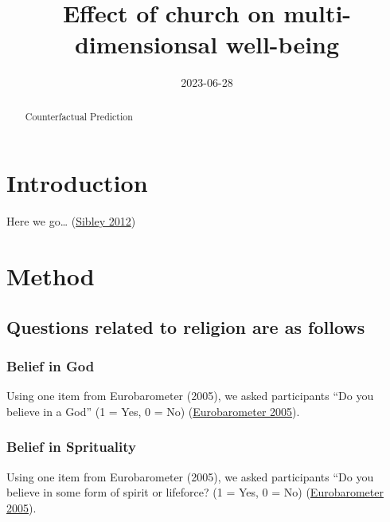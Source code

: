 \documentclass[
  singlecolumn]{report}
\title{Effect of church on multi-dimensionsal well-being}
\author{}
\date{2023-06-28}
\begin{document}
\maketitle
\begin{abstract}
Counterfactual Prediction
\end{abstract}
\ifdefined\Shaded\renewenvironment{Shaded}{\begin{tcolorbox}[enhanced, boxrule=0pt, borderline west={3pt}{0pt}{shadecolor}, sharp corners, frame hidden, interior hidden, breakable]}{\end{tcolorbox}}\fi

\listoffigures
\listoftables
\hypertarget{introduction}{%
\section{Introduction}\label{introduction}}

Here we go\ldots{} (\protect\hyperlink{ref-sibley2012}{Sibley 2012})

\hypertarget{method}{%
\section{Method}\label{method}}

\hypertarget{questions-related-to-religion-are-as-follows}{%
\subsection{Questions related to religion are as
follows}\label{questions-related-to-religion-are-as-follows}}

\hypertarget{belief-in-god}{%
\subsubsection{Belief in God}\label{belief-in-god}}

Using one item from Eurobarometer (2005), we asked participants ``Do you
believe in a God'' (1 = Yes, 0 = No)
(\protect\hyperlink{ref-eurobarometer2005b}{Eurobarometer 2005}).

\hypertarget{belief-in-sprituality}{%
\subsubsection{Belief in Sprituality}\label{belief-in-sprituality}}

Using one item from Eurobarometer (2005), we asked participants ``Do you
believe in some form of spirit or lifeforce? (1 = Yes, 0 = No)
(\protect\hyperlink{ref-eurobarometer2005b}{Eurobarometer 2005}).
\end{document}
